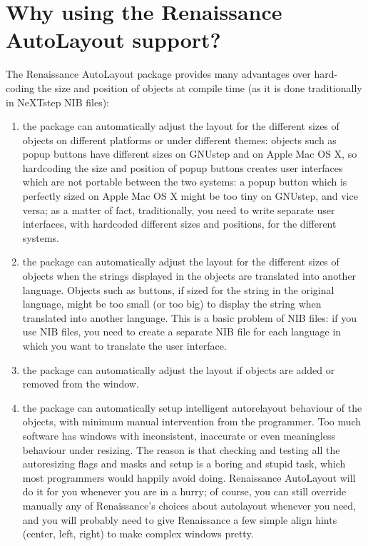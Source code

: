 \section{Why using the Renaissance AutoLayout support?}
The Renaissance AutoLayout package provides many advantages over
hard-coding the size and position of objects at compile time (as it is
done traditionally in NeXTstep NIB files):
\begin{enumerate}
\item the package can automatically adjust the layout for the different 
sizes of objects on different platforms or under different themes:
objects such as popup buttons have different sizes on GNUstep and on
Apple Mac OS X, so hardcoding the size and position of popup buttons
creates user interfaces which are not portable between the two
systems: a popup button which is perfectly sized on Apple Mac OS X might be
too tiny on GNUstep, and vice versa; as a matter of fact,
traditionally, you need to write separate user interfaces, with
hardcoded different sizes and positions, for the different systems.
\item the package can automatically adjust the layout for the different
sizes of objects when the strings displayed in the objects are
translated into another language.  Objects such as buttons, if sized
for the string in the original language, might be too small (or too
big) to display the string when translated into another language.
This is a basic problem of NIB files: if you use NIB files, you need
to create a separate NIB file for each language in which you want to
translate the user interface.
\item the package can automatically adjust the layout if objects are added
or removed from the window.
\item the package can automatically setup intelligent autorelayout 
behaviour of the objects, with minimum manual intervention from the
programmer.  Too much software has windows with inconsistent,
inaccurate or even meaningless behaviour under resizing.  The reason
is that checking and testing all the autoresizing flags and masks and
setup is a boring and stupid task, which most programmers would
happily avoid doing.  Renaissance AutoLayout will do it for you whenever
you are in a hurry; of course, you can still override manually any of
Renaissance's choices about autolayout whenever you need, and you will
probably need to give Renaissance a few simple align hints (center, left,
right) to make complex windows pretty.
\end{enumerate}

